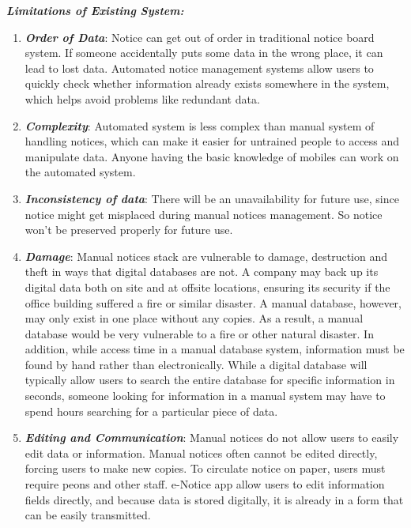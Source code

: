 \textbf{\emph{Limitations of Existing System:}}
\begin{enumerate}
\item \textbf{\emph{Order of Data}}: Notice can get out of order in traditional notice board system. If
someone accidentally puts some data in the wrong place, it can lead to lost data. Automated
notice management systems allow users to quickly check whether information already exists
somewhere in the system, which helps avoid problems like redundant data.
\item \textbf{\emph{Complexity}}: Automated system is less complex than manual system of handling notices, which can make
it easier for untrained people to access and manipulate data. Anyone having the basic knowledge
of mobiles can work on the automated system.
\item \textbf{\emph{Inconsistency of data}}: There will be an unavailability for future use, since notice might get
misplaced during manual notices management. So notice won't be preserved properly for future
use.
\item \textbf{\emph{Damage}}: Manual notices stack are vulnerable to damage, destruction and theft in ways that digital
databases are not. A company may back up its digital data both on site and at offsite locations,
ensuring its security if the office building suffered a fire or similar disaster. A manual database,
however, may only exist in one place without any copies.
As a result, a manual database would be very vulnerable to a fire or other natural disaster. In
addition, while access time in a manual database system, information must be found by hand
rather than electronically. While a digital database will typically allow users to search the entire
database for specific information in seconds, someone looking for information in a manual system
may have to spend hours searching for a particular piece of data.
\item \textbf{\emph{Editing and Communication}}: Manual notices do not allow users to easily edit data or
information. Manual notices often cannot be edited directly, forcing users to make new copies.
To circulate notice on paper, users must require peons and other staff. e-Notice app allow
users to edit information fields directly, and because data is stored digitally, it is already in a form
that can be easily transmitted.
\end{enumerate}

